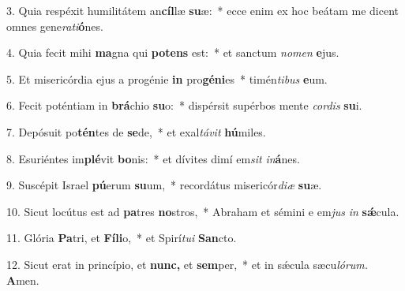 \item 3. Quia respéxit humilitátem an\textbf{cíl}læ \textbf{su}æ:~* ecce enim ex hoc beátam me dicent omnes gene\textit{rati}\textbf{ó}nes.

\item 4. Quia fecit mihi \textbf{ma}gna qui \textbf{pot}\textbf{ens} est:~* et sanctum \textit{nomen} \textbf{e}jus.

\item 5. Et misericórdia ejus a progénie \textbf{in} pro\textbf{gé}\textbf{ni}es~* timén\textit{tibus} \textbf{e}um.

\item 6. Fecit poténtiam in \textbf{brá}chio \textbf{su}o:~* dispérsit supérbos mente \textit{cordis} \textbf{su}i.

\item 7. Depósuit po\textbf{tén}tes de \textbf{se}de,~* et exal\textit{távit} \textbf{hú}miles.

\item 8. Esuriéntes im\textbf{plé}vit \textbf{bo}nis:~* et dívites dimí em\textit{sit} \textit{in}\textbf{á}nes.

\item 9. Suscépit Israel \textbf{pú}erum \textbf{su}um,~* recordátus misericór\textit{diæ} \textbf{su}æ.

\item 10. Sicut locútus est ad \textbf{pa}tres \textbf{no}stros,~* Abraham et sémini e em\textit{jus} \textit{in} \textbf{sǽ}cula.

\item 11. Glória \textbf{Pa}tri, et \textbf{Fí}\textbf{li}o,~* et Spirí\hspace{0.03em}\textit{tui} \textbf{San}cto.

\item 12. Sicut erat in princípio, et \textbf{nunc,} et \textbf{sem}per,~* et in sǽcula sæcu\hspace{0.03em}\textit{lórum.} \textbf{A}men.

